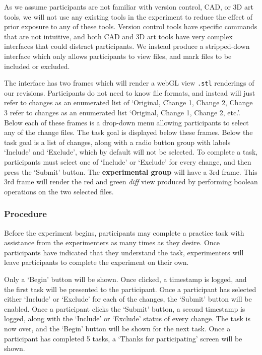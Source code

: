 \documentclass[sigconf,authorversion,nonacm]{acmart}
\begin{document}
As we assume participants are not familiar with version control, CAD, or 3D art tools, we will not use any existing tools in the experiment to reduce the effect of prior exposure to any of these tools.
Version control tools have specific commands that are not intuitive, and both CAD and 3D art tools have very complex interfaces that could distract participants.
We instead produce a stripped-down interface which only allows participants to view files, and mark files to be included or excluded.

The interface has two frames which will render a webGL view \texttt{.stl} renderings of our revisions.
Participants do not need to know file formats, and instead will just refer to changes as an enumerated list of `Original, Change 1, Change 2, Change 3 refer to changes as an enumerated list `Original, Change 1, Change 2, etc.'.
Below each of these frames is a drop-down menu allowing participants to select any of the change files.
The task goal is displayed below these frames.
Below the task goal is a list of changes, along with a radio button group with labels `Include' and `Exclude', which by default will not be selected.
To complete a task, participants must select one of `Include' or `Exclude' for every change, and then press the `Submit' button.
The \textbf{experimental group} will have a 3rd frame.
This 3rd frame will render the red and green \emph{diff} view produced by performing boolean operations on the two selected files.


\subsubsection{Procedure}

Before the experiment begins, participants may complete a practice task with assistance from the experimenters as many times as they desire.
Once participants have indicated that they understand the task, experimenters will leave participants to complete the experiment on their own.

Only a `Begin' button will be shown.
Once clicked, a timestamp is logged, and the first task will be presented to the participant.
Once a participant has selected either `Include' or `Exclude' for each of the changes, the `Submit' button will be enabled.
Once a participant clicks the `Submit' button, a second timestamp is logged, along with the `Include' or `Exclude' status of every change.
The task is now over, and the `Begin' button will be shown for the next task.
Once a participant has completed 5 tasks, a `Thanks for participating' screen will be shown.
\end{document}
